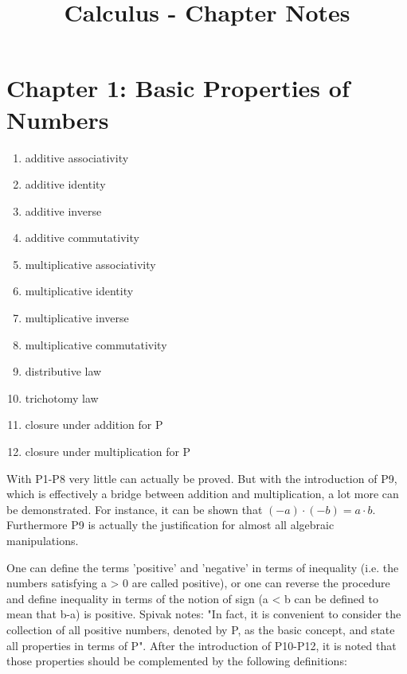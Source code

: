 \documentclass{article}
\begin{document}
\title{Calculus - Chapter Notes}
\author{}
\date{}
\maketitle

\section{Chapter 1: Basic Properties of Numbers}

\begin{enumerate}
	\item additive associativity
	\item additive identity
	\item additive inverse
	\item additive commutativity
	\item multiplicative associativity
	\item multiplicative identity
	\item multiplicative inverse
	\item multiplicative commutativity
	\item distributive law
	\item trichotomy law
	\item closure under addition for P
	\item closure under multiplication for P
\end{enumerate}

\begin{flushleft}
With P1-P8 very little can actually be proved. But with the introduction of P9, which is effectively a bridge between addition and multiplication, a lot more can be demonstrated. For instance, it can be shown that $(-a) \cdot (-b) = a \cdot b$. Furthermore P9 is actually the justification for almost all algebraic manipulations.
\end{flushleft}

\begin{flushleft}
One can define the terms 'positive' and 'negative' in terms of inequality (i.e. the numbers satisfying a > 0 are called positive), or one can reverse the procedure and define inequality in terms of the notion of sign (a < b can be defined to mean that b-a) is positive. Spivak notes: "In fact, it is convenient to consider the collection of all positive numbers, denoted by P, as the basic concept, and state all properties in terms of P". After the introduction of P10-P12, it is noted that those properties should be complemented by the following definitions:
\end{flushleft}
\end{document}

